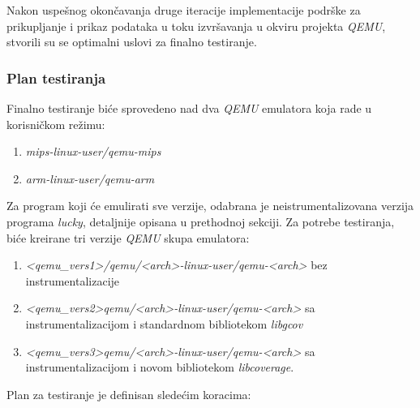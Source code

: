 \documentclass[12pt,oneside]{memoir}
\newcommand{\strano}[1]{\textit{#1}}
\begin{document}
Nakon uspešnog okončavanja druge iteracije implementacije podrške za prikupljanje i prikaz podataka u toku izvršavanja u okviru projekta \strano{QEMU}, stvorili su se optimalni uslovi za finalno testiranje. 

\subsubsection{Plan testiranja}

Finalno testiranje biće sprovedeno nad dva \strano{QEMU} emulatora koja rade u korisničkom režimu:
\begin{enumerate}
\item \strano{mips-linux-user/qemu-mips}
\item \strano{arm-linux-user/qemu-arm}
\end{enumerate}
Za program koji će emulirati sve verzije, odabrana je neistrumentalizovana verzija programa \strano{lucky}, detaljnije opisana u prethodnoj sekciji.
Za potrebe testiranja, biće kreirane tri verzije \strano{QEMU} skupa emulatora:
\begin{enumerate}
\item \strano{<qemu\_vers1>/qemu/<arch>-linux-user/qemu-<arch>} bez instrumentalizacije
\item \strano{<qemu\_vers2>qemu/<arch>-linux-user/qemu-<arch>} sa instrumentalizacijom i standardnom bibliotekom \strano{libgcov}
\item \strano{<qemu\_vers3>qemu/<arch>-linux-user/qemu-<arch>} sa instrumentalizacijom i novom bibliotekom \strano{libcoverage}.
\end{enumerate}
Plan za testiranje je definisan sledećim koracima:
\end{document}
